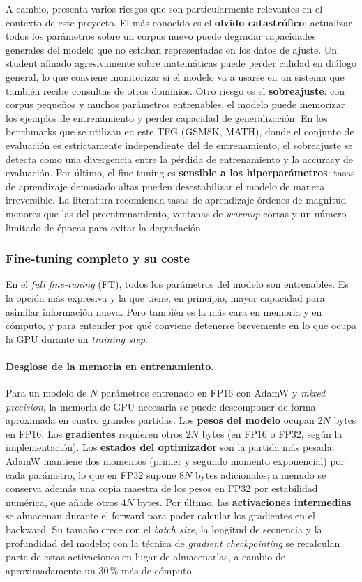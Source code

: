 \documentclass[11pt,a4paper]{article}
\begin{document}
A cambio, presenta varios riesgos que son particularmente relevantes en el contexto de este proyecto. El más conocido es el \textbf{olvido catastrófico}: actualizar todos los parámetros sobre un corpus nuevo puede degradar capacidades generales del modelo que no estaban representadas en los datos de ajuste. Un student afinado agresivamente sobre matemáticas puede perder calidad en diálogo general, lo que conviene monitorizar si el modelo va a usarse en un sistema que también recibe consultas de otros dominios. Otro riesgo es el \textbf{sobreajuste}: con corpus pequeños y muchos parámetros entrenables, el modelo puede memorizar los ejemplos de entrenamiento y perder capacidad de generalización. En los benchmarks que se utilizan en este TFG (GSM8K, MATH), donde el conjunto de evaluación es estrictamente independiente del de entrenamiento, el sobreajuste se detecta como una divergencia entre la pérdida de entrenamiento y la accuracy de evaluación. Por último, el fine-tuning es \textbf{sensible a los hiperparámetros}: tasas de aprendizaje demasiado altas pueden desestabilizar el modelo de manera irreversible. La literatura recomienda tasas de aprendizaje órdenes de magnitud menores que las del preentrenamiento, ventanas de \textit{warmup} cortas y un número limitado de épocas para evitar la degradación.

\subsubsection{Fine-tuning completo y su coste}

En el \textit{full fine-tuning} (FT), todos los parámetros del modelo son entrenables. Es la opción más expresiva y la que tiene, en principio, mayor capacidad para asimilar información nueva. Pero también es la más cara en memoria y en cómputo, y para entender por qué conviene detenerse brevemente en lo que ocupa la GPU durante un \textit{training step}.

\paragraph{Desglose de la memoria en entrenamiento.} Para un modelo de $N$ parámetros entrenado en FP16 con AdamW y \textit{mixed precision}, la memoria de GPU necesaria se puede descomponer de forma aproximada en cuatro grandes partidas. Los \textbf{pesos del modelo} ocupan $2N$ bytes en FP16. Los \textbf{gradientes} requieren otros $2N$ bytes (en FP16 o FP32, según la implementación). Los \textbf{estados del optimizador} son la partida más pesada: AdamW mantiene dos momentos (primer y segundo momento exponencial) por cada parámetro, lo que en FP32 supone $8N$ bytes adicionales; a menudo se conserva además una copia maestra de los pesos en FP32 por estabilidad numérica, que añade otros $4N$ bytes. Por último, las \textbf{activaciones intermedias} se almacenan durante el forward para poder calcular los gradientes en el backward. Su tamaño crece con el \textit{batch size}, la longitud de secuencia y la profundidad del modelo; con la técnica de \textit{gradient checkpointing} se recalculan parte de estas activaciones en lugar de almacenarlas, a cambio de aproximadamente un 30\,\% más de cómputo.
\end{document}
